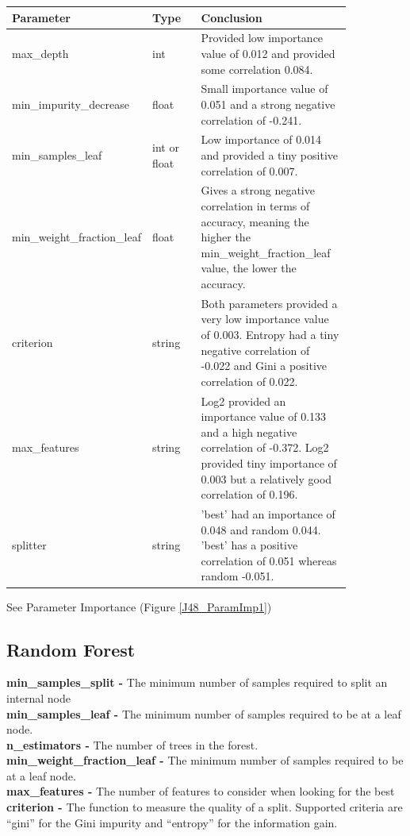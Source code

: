 \documentclass[11pt]{article}
\begin{document}
\begin{table}[h]
  \centering
  \begin{tabular}{|p{0.25\linewidth} | p{0.15 \linewidth} | p{0.45\linewidth}|} 
    \hline
    \textbf{Parameter}  & \textbf{Type} &\textbf{Conclusion} \\ \hline
    max\_depth & int & Provided low importance value of 0.012 and provided some correlation 0.084. \\ \hline
    min\_impurity\_decrease & float & Small importance value of 0.051 and a strong negative correlation of -0.241.  \\ \hline
    min\_samples\_leaf & int or float & Low importance of 0.014 and provided a tiny positive correlation of 0.007. \\ \hline
    min\_weight\_fraction\_leaf & float & Gives a strong negative correlation in terms of accuracy, meaning the higher the min\_weight\_fraction\_leaf value, the lower the accuracy.\\ \hline
    criterion & string & Both parameters provided a very low importance value of 0.003. Entropy had a tiny negative correlation of -0.022 and Gini a positive correlation of 0.022. \\ \hline
    max\_features & string & Log2 provided an importance value of 0.133 and a high negative correlation of -0.372. Log2 provided tiny importance of 0.003 but a relatively good correlation of 0.196. \\ \hline
    splitter & string & 'best' had an importance of 0.048 and random 0.044. 'best' has a positive correlation of 0.051 whereas random -0.051. \\ \hline
  \end{tabular}
\end{table}\label{RF_Analysis_Table}
See Parameter Importance (Figure \ref{J48_ParamImp1})
\FloatBarrier

\newpage
\subsection{Random Forest}
\cite{SklearnEnsembleRandomForestClassifier}
\par
\textbf{min\_samples\_split -} The minimum number of samples required to split an internal node \\
\textbf{min\_samples\_leaf -} The minimum number of samples required to be at a leaf node.  \\
\textbf{n\_estimators -} The number of trees in the forest.\\
\textbf{min\_weight\_fraction\_leaf -} The minimum number of samples required to be at a leaf node. \\
\textbf{max\_features -} The number of features to consider when looking for the best \\
\textbf{criterion -} The function to measure the quality of a split. Supported criteria are “gini” for the Gini impurity and “entropy” for the information gain. \\
\end{document}
